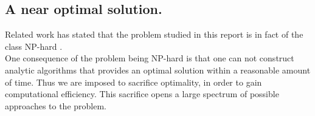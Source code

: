 




\subsection{A near optimal solution.}

Related work has stated that the problem studied in this report is in fact of the class NP-hard \cite{paper1}.\\ %
One consequence of the problem being NP-hard is that one can not construct analytic algorithms that provides an optimal solution within a reasonable amount of time. Thus we are imposed to sacrifice optimality, in order to gain computational efficiency. This sacrifice opens a large spectrum of possible approaches to the problem.

